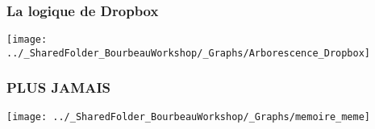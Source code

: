 \documentclass{beamer}
\begin{document}
% 
% 
% 
% 
% 
% 
% 
% 
% 
% 
% 

	
	  \begin{frame}
	        \frametitle{La logique de Dropbox} \vspace{1cm}   
	        \begin{center}
	           \texttt{[image: ../\_SharedFolder\_BourbeauWorkshop/\_Graphs/Arborescence\_Dropbox]}
	        \end{center}  
	    \end{frame}
	    
	
	  \begin{frame}
	        \frametitle{PLUS JAMAIS} \vspace{1cm}   
	        \begin{center}
	           \texttt{[image: ../\_SharedFolder\_BourbeauWorkshop/\_Graphs/memoire\_meme]}
	        \end{center}  
	    \end{frame}
	    
\end{document}
